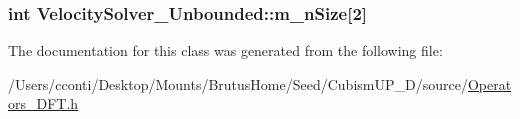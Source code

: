 \subsubsection[{m\+\_\+n\+Size}]{\setlength{\rightskip}{0pt plus 5cm}int Velocity\+Solver\+\_\+\+Unbounded\+::m\+\_\+n\+Size\mbox{[}2\mbox{]}\hspace{0.3cm}{\ttfamily [protected]}}\label{class_velocity_solver___unbounded_a5a06247f4313780a5cb906d64bcd8f80}


The documentation for this class was generated from the following file\+:\begin{DoxyCompactItemize}
\item 
/\+Users/cconti/\+Desktop/\+Mounts/\+Brutus\+Home/\+Seed/\+Cubism\+U\+P\+\_\+D/source/\hyperlink{_operators___d_f_t_8h}{Operators\+\_\+\+D\+F\+T.\+h}\end{DoxyCompactItemize}
